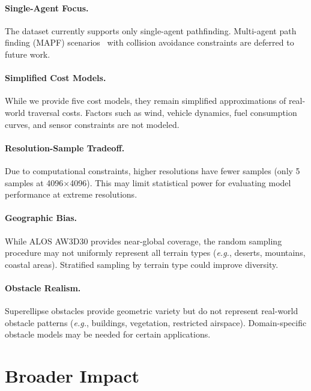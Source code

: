 \documentclass{article}
\providecommand{\eg}{\textit{e.g.}}
\begin{document}
\paragraph{Single-Agent Focus.}
The dataset currently supports only single-agent pathfinding. Multi-agent path finding (MAPF) scenarios~\cite{stern2019mapf} with collision avoidance constraints are deferred to future work.

\paragraph{Simplified Cost Models.}
While we provide five cost models, they remain simplified approximations of real-world traversal costs. Factors such as wind, vehicle dynamics, fuel consumption curves, and sensor constraints are not modeled.

\paragraph{Resolution-Sample Tradeoff.}
Due to computational constraints, higher resolutions have fewer samples (only 5 samples at 4096$\times$4096). This may limit statistical power for evaluating model performance at extreme resolutions.

\paragraph{Geographic Bias.}
While ALOS AW3D30 provides near-global coverage, the random sampling procedure may not uniformly represent all terrain types (\eg, deserts, mountains, coastal areas). Stratified sampling by terrain type could improve diversity.

\paragraph{Obstacle Realism.}
Superellipse obstacles provide geometric variety but do not represent real-world obstacle patterns (\eg, buildings, vegetation, restricted airspace). Domain-specific obstacle models may be needed for certain applications.

\section{Broader Impact}
\label{sec:impact}
\end{document}
